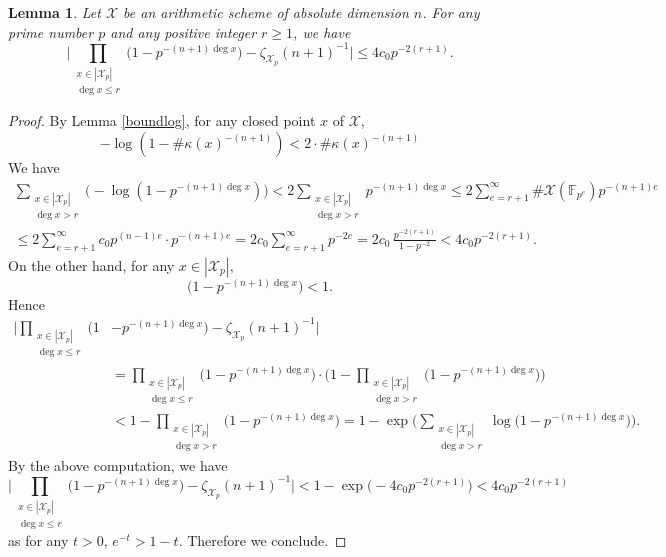 \documentclass[JEP,XML,SOM,Unicode,published]{cedram}
\theoremstyle{plain}
\newtheorem{lem}[thm]{Lemma}
\theoremstyle{definition}
\newcommand{\X}{\mathcal{X}}
\newcommand{\F}{\mathbb{F}}
\begin{document}
\begin{lem}\label{zetafinite}
Let $\X$ be an arithmetic scheme of absolute dimension $n$. For any prime number $p$ and any positive integer $r\geq 1$, we have
\[
\biggl| \prod_{\substack{x\in |\X_{p}|\\ \deg x\leq r}} \bigl(1-p^{-(n+1)\deg x} \bigr) - \zeta_{\X_p}(n+1)^{-1} \biggr|\leq 4c_0 p^{-2(r+1)}.
\]
\end{lem}
\begin{proof}
By Lemma \ref{boundlog}, for any closed point $x$ of $\X$,
\[
- \log(1-\#\kappa(x)^{-(n+1)})<2\cdot\#\kappa(x)^{-(n+1)}
\]
We have
\begin{multline*}
\sum_{\substack{x\in |\X_{p}|\\ \deg x> r}}\bigl(- \log(1-p^{-(n+1)\deg x}) \bigr) < 2\sum_{\substack{x\in |\X_{p}|\\ \deg x> r}} p^{-(n+1)\deg x} \leq 2\sum_{e=r+1}^{\infty}\#\X(\F_{p^e}) p^{-(n+1)e} \\
\leq 2\sum_{e=r+1}^{\infty}c_0p^{(n-1)e}\cdot p^{-(n+1)e} 
= 2c_0\sum_{e=r+1}^{\infty} p^{-2e}= 2c_0\,\frac{p^{-2(r+1)}}{1-p^{-2}}< 4c_0p^{-2(r+1)}.
\end{multline*}
On the other hand, for any $x\in |\X_{p}|$,
\[
\bigl(1-p^{-(n+1)\deg x} \bigr)<1.
\]
Hence
\begin{align*}
\biggl| \prod_{\substack{x\in |\X_{p}|\\ \deg x\leq r}} \bigl(1&-p^{-(n+1)\deg x} \bigr) - \zeta_{\X_p}(n+1)^{-1} \biggr| \\[-5pt]
&= \prod_{\substack{x\in |\X_{p}|\\ \deg x\leq r}} \bigl(1-p^{-(n+1)\deg x} \bigr)\cdot \biggl(1- \prod_{\substack{x\in |\X_{p}|\\ \deg x> r}} \bigl(1-p^{-(n+1)\deg x} \bigr) \biggr) \\
&<1- \prod_{\substack{x\in |\X_{p}|\\ \deg x> r}} \bigl(1-p^{-(n+1)\deg x} \bigr) =1-\exp \biggl(\sum_{\substack{x\in |\X_{p}|\\ \deg x> r}} \log \bigl(1-p^{-(n+1)\deg x} \bigr) \biggr).
\end{align*}
By the above computation, we have
\[
\biggl | \prod_{\substack{x\in |\X_{p}|\\ \deg x\leq r}} \bigl(1-p^{-(n+1)\deg x} \bigr) - \zeta_{\X_p}(n+1)^{-1} \biggr|
< 1-\exp \bigl(-4c_0p^{-2(r+1)} \bigr) < 4c_0p^{-2(r+1)}
\]
as for any $t>0$, $e^{-t}>1-t$. Therefore we conclude.
\end{proof}
\end{document}
